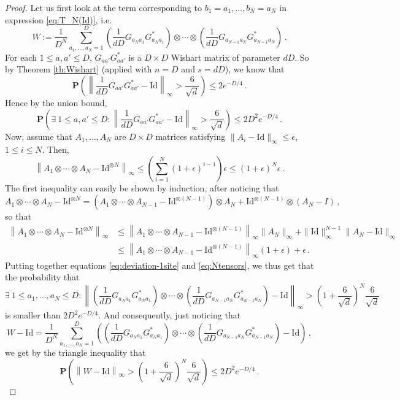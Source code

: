 \documentclass{amsart}
\renewcommand{\P}{\mathbf{P}}
\renewcommand{\leq}{\leqslant}
\newcommand{\Id}{\mathrm{Id}}
\begin{document}
\begin{proof}
    Let us first look at the term corresponding to $b_1=a_1,\ldots,b_N=a_N$ in expression \eqref{eq:T_N(Id)}, i.e.
    \[ W := \frac{1}{D^N} \sum_{a_1,\ldots,a_N=1}^D \left(\frac{1}{dD}G_{a_Na_1}G^*_{a_Na_1} \right) \otimes\cdots\otimes \left(\frac{1}{dD}G_{a_{N-1}a_N}G^*_{a_{N-1}a_N} \right) \, . \]
    For each $1\leq a,a'\leq D$, $G_{aa'}G_{aa'}^*$ is a $D\times D$ Wishart matrix of parameter $dD$. So by Theorem \ref{th:Wishart} (applied with $n=D$ and $s=dD$), we know that
    \[ \P \left( \left\| \frac{1}{dD}G_{aa'}G_{aa'}^* - \Id \right\|_{\infty} > \frac{6}{\sqrt{d}} \right) \leq 2e^{-D/4} \, .  \]
    Hence by the union bound,
    \begin{equation} \label{eq:deviation-1site}
        \P \left( \exists\ 1\leq a,a'\leq D : \left\| \frac{1}{dD}G_{aa'}G_{aa'}^* - \Id \right\|_{\infty} > \frac{6}{\sqrt{d}} \right) \leq 2D^2e^{-D/4} \, .
    \end{equation}
    Now, assume that $A_1,\ldots,A_N$ are $D\times D$ matrices satisfying $\|A_i-\Id\|_{\infty}\leq \epsilon$, $1\leq i\leq N$. Then,
    \begin{equation} \label{eq:Ntensors}
        \left\|A_1\otimes\cdots\otimes A_N - \Id^{\otimes N}\right\|_{\infty} \leq \left(\sum_{i=1}^N (1+\epsilon)^{i-1}\right)\epsilon \leq (1+\epsilon)^N\epsilon \, .
    \end{equation}
    The first inequality can easily be shown by induction, after noticing that
    \[ A_1\otimes\cdots\otimes A_N - \Id^{\otimes N} = \left(A_1\otimes\cdots\otimes A_{N-1}-\Id^{\otimes (N-1)}\right)\otimes A_N + \Id^{\otimes (N-1)}\otimes(A_N-I) \, , \]
    so that
    \begin{align*}
        \left\|A_1\otimes\cdots\otimes A_N - \Id^{\otimes N}\right\|_{\infty} & \leq \left\|A_1\otimes\cdots\otimes A_{N-1}-\Id^{\otimes (N-1)}\right\|_{\infty} \|A_N\|_{\infty} + \|\Id\|^{N-1}_{\infty}\|A_N-\Id\|_{\infty} \\
                                                                              & \leq \left\|A_1\otimes\cdots\otimes A_{N-1}-\Id^{\otimes (N-1)}\right\|_{\infty}(1+\epsilon) + \epsilon \, .
    \end{align*}
    Putting together equations \eqref{eq:deviation-1site} and \eqref{eq:Ntensors}, we thus get that the probability that
    \[ \exists\ 1\leq a_1,\ldots,a_N\leq D : \left\| \left(\frac{1}{dD}G_{a_Na_1}G^*_{a_Na_1} \right) \otimes\cdots\otimes \left(\frac{1}{dD}G_{a_{N-1}a_N}G^*_{a_{N-1}a_N} \right) - \Id \right\|_{\infty} > \left(1+\frac{6}{\sqrt{d}}\right)^N\frac{6}{\sqrt{d}} \]
    is smaller than $2D ^2e^{-D/4}$.
    And consequently, just noticing that
    \[ W-\Id = \frac{1}{D^N} \sum_{a_1,\ldots,a_N=1}^D \left( \left(\frac{1}{dD}G_{a_Na_1}G^*_{a_Na_1} \right) \otimes\cdots\otimes \left(\frac{1}{dD}G_{a_{N-1}a_N}G^*_{a_{N-1}a_N} \right) -\Id \right) \, , \]
    we get by the triangle inequality that
    \[ \P\left(  \left\| W - \Id \right\|_{\infty} > \left(1+\frac{6}{\sqrt{d}}\right)^N\frac{6}{\sqrt{d}} \right) \leq 2D ^2e^{-D/4} \, . \]


\end{proof}
\end{document}
